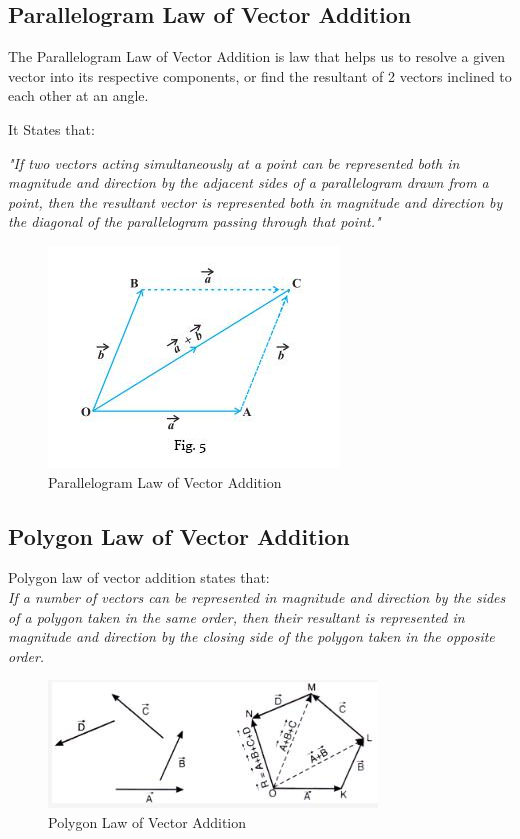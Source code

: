 \documentclass[11pt]{article}
\begin{document}
\subsection{Parallelogram Law of Vector Addition}

The Parallelogram Law of Vector Addition is law that helps us to resolve a given vector into its respective components, or find the resultant of 2 vectors inclined to each other at an angle. 

It States that: 

\textit{"If two vectors acting simultaneously at a point can be represented both in magnitude and direction by the adjacent sides of a parallelogram drawn from a point, then the resultant vector is represented both in magnitude and direction by the diagonal of the parallelogram passing through that point."}

\begin{figure}[H]
	\centering
	\includegraphics[scale=0.5]{Parallelogram law.jpg}
	\caption{Parallelogram Law of Vector Addition}
	\label{fig:Parallelogram law}
\end{figure}

\subsection{Polygon Law of Vector Addition}

Polygon law of vector addition states that: \\

\textit{If a number of vectors can be represented in magnitude and direction by the sides of a polygon taken in the same order, then their resultant is represented in magnitude and direction by the closing side of the polygon taken in the opposite order.}

\begin{figure}[H]
	\centering
	\includegraphics[scale=0.7]{polygon law.jpg}
	\caption{Polygon Law of Vector Addition}
	\label{fig: Polygon Law}
\end{figure}
\end{document}
